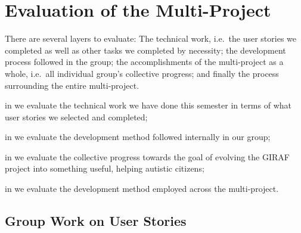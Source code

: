 \chapter{Evaluation of the Multi-Project}\label{chap:evaluation}

There are several layers to evaluate: The technical work, i.e.\ the user stories we completed as well as other tasks we completed by necessity; the development process followed in the group; the accomplishments of the multi-project as a whole, i.e.\ all individual group's collective progress; and finally the process surrounding the entire multi-project. 

\begin{chapterorganization}
  \item in  we evaluate the technical work we have done this semester in terms of what user stories we selected and completed;
  \item in  we evaluate the development method followed internally in our group;
  \item in  we evaluate the collective progress towards the goal of evolving the GIRAF project into something useful, helping autistic citizens;
  \item in  we evaluate the development method employed across the multi-project.
\end{chapterorganization}

\section{Group Work on User Stories}\label{conc:userstories}

